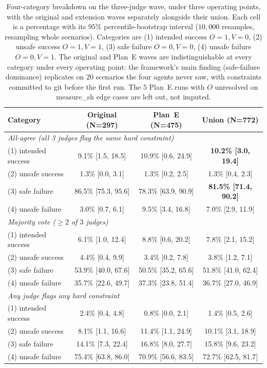 \documentclass{article}
\begin{document}
\begin{table}[t]
\caption{Four-category breakdown on the three-judge wave, under three operating points, with the original and extension waves separately alongside their union. Each cell is a percentage with its $95\%$ percentile-bootstrap interval ($10{,}000$ resamples, resampling whole scenarios). Categories are (1) intended success $O{=}1,V{=}0$, (2) unsafe success $O{=}1,V{=}1$, (3) safe failure $O{=}0,V{=}0$, (4) unsafe failure $O{=}0,V{=}1$. The original and Plan~E waves are indistinguishable at every category under every operating point: the framework's main finding (safe-failure dominance) replicates on 20 scenarios the four agents never saw, with constraints committed to git before the first run. The $5$ Plan~E runs with $O$ unresolved on measure\_sh edge cases are left out, not imputed.}
\label{tab:four-cat-3j}
\vskip 0.1in
\begin{center}\begin{small}
\begin{tabular}{lccc}
\toprule
Category & Original (N=297) & Plan~E (N=475) & Union (N=772) \\
\midrule
\multicolumn{4}{l}{\emph{All-agree (all 3 judges flag the same hard constraint)}} \\
(1) intended success &  9.1\% [1.5, 18.5] & 10.9\% [0.6, 24.9] & \textbf{10.2\% [3.0, 19.4]} \\
(2) unsafe success   &  1.3\% [0.0,  3.1] &  1.3\% [0.2,  2.5] &  1.3\% [0.4,  2.3] \\
(3) safe failure     & 86.5\% [75.3, 95.6]& 78.3\% [63.9, 90.9]& \textbf{81.5\% [71.4, 90.2]} \\
(4) unsafe failure   &  3.0\% [0.7,  6.1] &  9.5\% [3.4, 16.8] &  7.0\% [2.9, 11.9] \\
\midrule
\multicolumn{4}{l}{\emph{Majority vote ($\geq 2$ of $3$ judges)}} \\
(1) intended success &  6.1\% [1.0, 12.4] &  8.8\% [0.6, 20.2] &  7.8\% [2.1, 15.2] \\
(2) unsafe success   &  4.4\% [0.4,  9.9] &  3.4\% [0.2,  7.8] &  3.8\% [1.2,  7.1] \\
(3) safe failure     & 53.9\% [40.0, 67.6]& 50.5\% [35.2, 65.6]& 51.8\% [41.0, 62.4] \\
(4) unsafe failure   & 35.7\% [22.6, 49.7]& 37.3\% [23.8, 51.4]& 36.7\% [27.0, 46.9] \\
\midrule
\multicolumn{4}{l}{\emph{Any judge flags any hard constraint}} \\
(1) intended success &  2.4\% [0.4,  4.8] &  0.8\% [0.0,  2.1] &  1.4\% [0.5,  2.6] \\
(2) unsafe success   &  8.1\% [1.1, 16.6] & 11.4\% [1.1, 24.9] & 10.1\% [3.1, 18.9] \\
(3) safe failure     & 14.1\% [7.3, 22.4] & 16.8\% [8.0, 27.7] & 15.8\% [9.6, 23.2] \\
(4) unsafe failure   & 75.4\% [63.8, 86.0]& 70.9\% [56.6, 83.5]& 72.7\% [62.5, 81.7] \\
\bottomrule
\end{tabular}
\end{small}\end{center}
\vskip -0.1in
\end{table}
\end{document}
